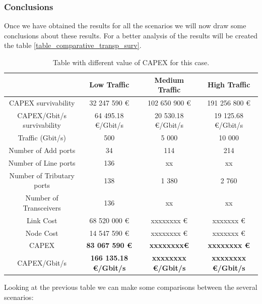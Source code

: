 \subsubsection{Conclusions}

Once we have obtained the results for all the scenarios we will now draw some conclusions about these results. For a better analysis of the results will be created the table \ref{table_comparative_transp_surv}.\\

\begin{table}[h!]
\centering
\begin{tabular}{| c | c | c | c |}
 \hline
  & Low Traffic & Medium Traffic  & High Traffic \\
 \hline\hline
 CAPEX survivability & 32 247 590 \euro & 102 650 900 \euro & 191 256 800 \euro \\ \hline
 CAPEX/Gbit/s survivability & 64 495.18 \euro/Gbit/s & 20 530.18 \euro/Gbit/s & 19 125.68 \euro/Gbit/s \\ \hline
 Traffic (Gbit/s) & 500 & 5 000 & 10 000 \\ \hline
 Number of Add ports & 34 & 114 & 214 \\ \hline
 Number of Line ports & 136 & xx & xx \\ \hline
 Number of Tributary ports & 138 & 1 380 & 2 760 \\ \hline
 Number of Transceivers & 136 & xx & xx \\ \hline
 Link Cost & 68 520 000 \euro & xxxxxxxx \euro & xxxxxxx \euro \\ \hline
 Node Cost & 14 547 590 \euro & xxxxxxxx \euro & xxxxxxx \euro \\ \hline
 CAPEX & \textbf{83 067 590 \euro} & \textbf{xxxxxxxx\euro} & \textbf{xxxxxxxx \euro} \\ \hline
 CAPEX/Gbit/s & \textbf{166 135.18 \euro/Gbit/s} & \textbf{xxxxxxxx \euro/Gbit/s} & \textbf{xxxxxxxx \euro/Gbit/s}\\
 \hline
\end{tabular}
\caption{Table with different value of CAPEX for this case.}
\label{table_comparative_transp_protec}
\end{table}

\newpage
Looking at the previous table we can make some comparisons between the several scenarios:


